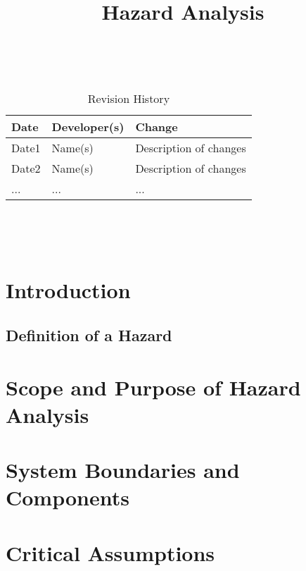 \documentclass{article}
\title{Hazard Analysis\\\progname}
\author{\authname}
\date{}
\begin{document}
	
	\maketitle
	\thispagestyle{empty}
	
	~\newpage
	
	
	\begin{table}[hp]
		\caption{Revision History} \label{TblRevisionHistory}
		\begin{tabularx}{\textwidth}{llX}
			\toprule
			\textbf{Date} & \textbf{Developer(s)} & \textbf{Change}\\
			\midrule
			Date1 & Name(s) & Description of changes\\
			Date2 & Name(s) & Description of changes\\
			... & ... & ...\\
			\bottomrule
		\end{tabularx}
	\end{table}
	
	~\newpage
	
	\tableofcontents
	
	~\newpage
	
	
	
	\section{Introduction}
	
	\subsection{Definition of a Hazard}
	
	\section{Scope and Purpose of Hazard Analysis}
	
	\section{System Boundaries and Components}
	
	\section{Critical Assumptions}
	
\end{document}
